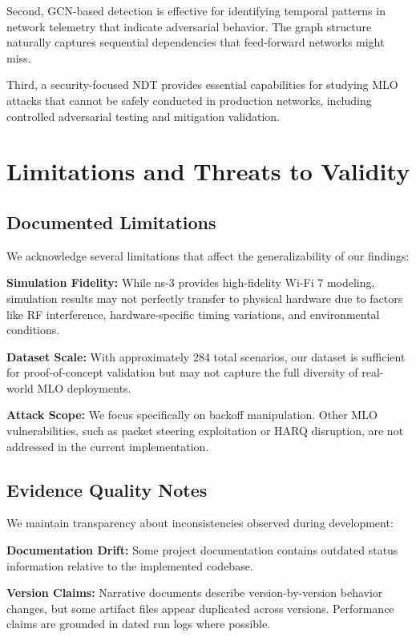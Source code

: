 \documentclass[conference]{IEEEtran}
\begin{document}
Second, GCN-based detection is effective for identifying temporal patterns in network telemetry that indicate adversarial behavior. The graph structure naturally captures sequential dependencies that feed-forward networks might miss.

Third, a security-focused NDT provides essential capabilities for studying MLO attacks that cannot be safely conducted in production networks, including controlled adversarial testing and mitigation validation.

\section{Limitations and Threats to Validity}
\label{sec:limitations}

\subsection{Documented Limitations}

We acknowledge several limitations that affect the generalizability of our findings:

\textbf{Simulation Fidelity:} While ns-3 provides high-fidelity Wi-Fi 7 modeling, simulation results may not perfectly transfer to physical hardware due to factors like RF interference, hardware-specific timing variations, and environmental conditions.

\textbf{Dataset Scale:} With approximately 284 total scenarios, our dataset is sufficient for proof-of-concept validation but may not capture the full diversity of real-world MLO deployments.

\textbf{Attack Scope:} We focus specifically on backoff manipulation. Other MLO vulnerabilities, such as packet steering exploitation or HARQ disruption, are not addressed in the current implementation.

\subsection{Evidence Quality Notes}

We maintain transparency about inconsistencies observed during development:

\textbf{Documentation Drift:} Some project documentation contains outdated status information relative to the implemented codebase.

\textbf{Version Claims:} Narrative documents describe version-by-version behavior changes, but some artifact files appear duplicated across versions. Performance claims are grounded in dated run logs where possible.
\end{document}
